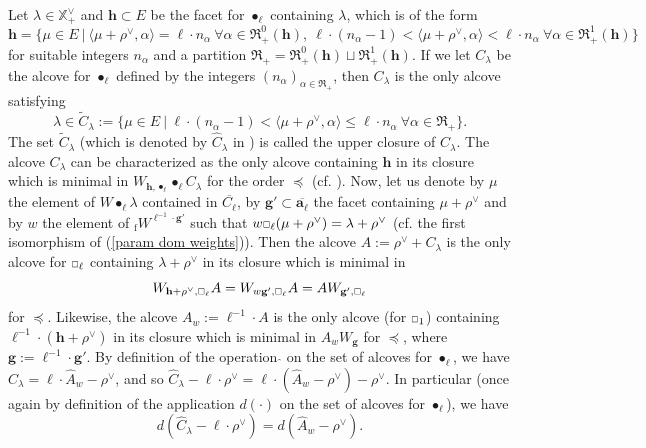 \documentclass[11pt]{amsart}
\theoremstyle{plain}
\theoremstyle{remark}
\newcommand{\car}{\mbox{\relsize{-5}$\Box$}}
\numberwithin{equation}{section}
\begin{document}
	Let $\lambda\in\mathbb{X}_{+}^\vee$ and $\mathbf{h}\subset E$ be the facet for $\bullet_\ell$ containing $\lambda$, which is of the form 
	\begin{equation*}
		\mathbf{h}=\{\mu\in E~|~\langle\mu+\rho^\vee,\alpha\rangle=\ell\cdot n_\alpha~\forall\alpha\in\mathfrak{R}^0_+(\mathbf{h}),~
		\ell\cdot(n_\alpha-1)<\langle\mu+\rho^\vee,\alpha\rangle<\ell\cdot n_\alpha~\forall\alpha\in\mathfrak{R}^1_+(\mathbf{h})\} 
	\end{equation*} for suitable integers $n_\alpha$ and a partition $\mathfrak{R}_+=\mathfrak{R}^0_+(\mathbf{h})\sqcup\mathfrak{R}^1_+(\mathbf{h})$. If we let $C_\lambda$ be the alcove for $\bullet_\ell$ defined by the integers $(n_\alpha)_{\alpha\in\mathfrak{R}_+}$, then $C_\lambda$ is the only alcove satisfying
	$$\lambda\in \widetilde{C}_\lambda:=\{\mu\in E~|~
	\ell\cdot(n_\alpha-1)<\langle\mu+\rho^\vee,\alpha\rangle\leq\ell\cdot n_\alpha~\forall\alpha\in\mathfrak{R}_+\}.$$
	The set $\widetilde{C}_\lambda$ (which is denoted by $\widehat{C}_\lambda$ in \cite{jantzen2003representations}) is called the upper closure of $C_\lambda$. The alcove $C_\lambda$ can be characterized as the only alcove containing $\mathbf{h}$ in its closure which is minimal in $W_{\mathbf{h},\bullet_\ell}\bullet_\ell C_\lambda$ for the order $\preceq$ (cf. \cite[§6.11]{jantzen2003representations}). Now, let us denote by $\mu$ the element of $W\bullet_\ell\lambda$ contained in $\overline{C_\ell}$, by $\mathbf{g}'\subset\overline{\mathbf{a}_\ell}$ the facet containing $\mu+\rho^\vee$ and by $w$ the element of ${_\mathrm{f}W}^{\ell^{-1}\cdot\mathbf{g}'}$ such that $w\car_\ell(\mu+\rho^\vee)=\lambda+\rho^\vee$ (cf. the first isomorphism of (\ref{param dom weights})). Then the alcove $A:=\rho^\vee+C_\lambda$ is the only alcove for $\car_\ell$ containing $\lambda+\rho^\vee$ in its closure which is minimal in 
	$$W_{\mathbf{h}+\rho^\vee,\car_\ell} A=W_{w\mathbf{g}',\car_\ell}A=AW_{\mathbf{g}',\car_\ell}$$ 
	for $\preceq$. Likewise, the alcove $A_w:=\ell^{-1}\cdot A$ is the only alcove (for $\car_1$) containing $\ell^{-1}\cdot (\mathbf{h}+\rho^\vee)$ in its closure which is minimal in $A_wW_{\mathbf{g}}$ for $\preceq$, where $\mathbf{g}:=\ell^{-1}\cdot\mathbf{g}'$. By definition of the operation $\hat{}$ on the set of alcoves for $\bullet_\ell$, we have $\hat{C}_\lambda=\ell\cdot\hat{A}_w-\rho^\vee$, and so $\hat{C}_\lambda-\ell\cdot\rho^\vee=\ell\cdot(\hat{A}_w-\rho^\vee)-\rho^\vee$. In particular (once again by definition of the application $d(\cdot)$ on the set of alcoves for $\bullet_\ell$), we have
	\begin{equation}\label{distance}
		d(\hat{C}_\lambda-\ell\cdot\rho^\vee)=d(\hat{A}_w-\rho^\vee). 
	\end{equation}
\end{document}
